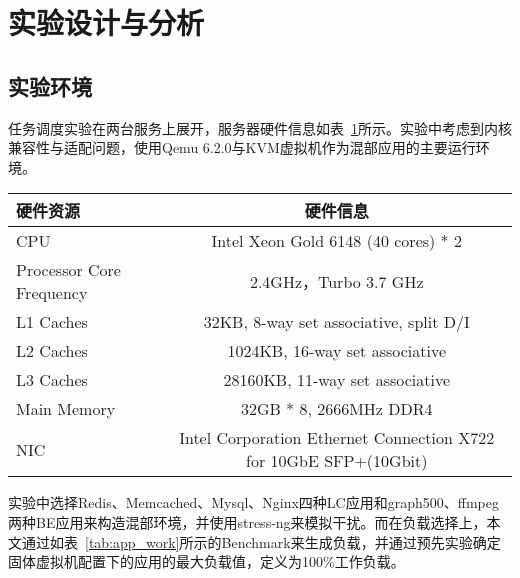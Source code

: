 
\section{实验设计与分析}

\subsection{实验环境}

任务调度实验在两台服务上展开，服务器硬件信息如表~\ref{tab:exp_env}所示。实验中考虑到内核兼容性与适配问题，使用Qemu 6.2.0与KVM虚拟机作为混部应用的主要运行环境。

\begin{table}[H]
    \label{tab:exp_env}
    \footnotesize%
    \setlength{\tabcolsep}{4pt}%
    \renewcommand{\arraystretch}{1.25}%
    \centering
    \begin{tabular}{lc}
        \hline
        硬件资源 & 硬件信息 \\
        \hline
        CPU & Intel Xeon Gold 6148 (40 cores) * 2 \\
        Processor Core Frequency & 2.4GHz，Turbo 3.7 GHz \\
        L1 Caches & 32KB,  8-way set associative, split D/I \\
        L2 Caches & 1024KB, 16-way set associative \\
        L3 Caches & 28160KB, 11-way set associative \\
        Main Memory & 32GB * 8, 2666MHz DDR4 \\
        NIC & Intel Corporation Ethernet Connection X722 for 10GbE SFP+(10Gbit) \\
        \hline
    \end{tabular}
\end{table}

实验中选择Redis、Memcached、Mysql、Nginx四种LC应用和graph500、ffmpeg两种BE应用来构造混部环境，并使用stress-ng来模拟干扰。而在负载选择上，本文通过如表~\ref{tab:app_work}所示的Benchmark来生成负载，并通过预先实验确定固体虚拟机配置下的应用的最大负载值，定义为100\%工作负载。

